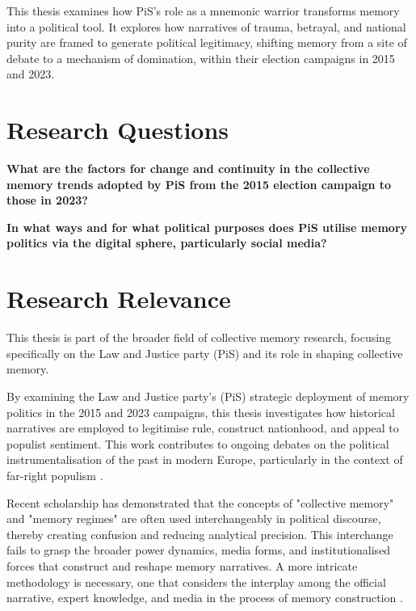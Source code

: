 This thesis examines how PiS’s role as a mnemonic warrior transforms memory into a political tool. It explores how narratives of trauma, betrayal, and national purity are framed to generate political legitimacy, shifting memory from a site of debate to a mechanism of domination, within their election campaigns in 2015 and 2023.

\section{Research Questions}

\begin{displayquote}
\textbf{What are the factors for change and continuity in the collective memory trends adopted by PiS from the 2015 election campaign to those in 2023?}

\vspace{1cm}

\textbf{In what ways and for what political purposes does PiS utilise memory politics via the digital sphere, particularly social media?}
\end{displayquote}

\section{Research Relevance}

This thesis is part of the broader field of collective memory research, focusing specifically on the Law and Justice party (PiS) and its role in shaping collective memory.

By examining the Law and Justice party's (PiS) strategic deployment of memory politics in the 2015 and 2023 campaigns, this thesis investigates how historical narratives are employed to legitimise rule, construct nationhood, and appeal to populist sentiment. This work contributes to ongoing debates on the political instrumentalisation of the past in modern Europe, particularly in the context of far-right populism \citep{couperus_memory_2023}.

Recent scholarship has demonstrated that the concepts of "collective memory" and "memory regimes" are often used interchangeably in political discourse, thereby creating confusion and reducing analytical precision. This interchange fails to grasp the broader power dynamics, media forms, and institutionalised forces that construct and reshape memory narratives. A more intricate methodology is necessary, one that considers the interplay among the official narrative, expert knowledge, and media in the process of memory construction \citep{dujisin_reassessing_2024}.

